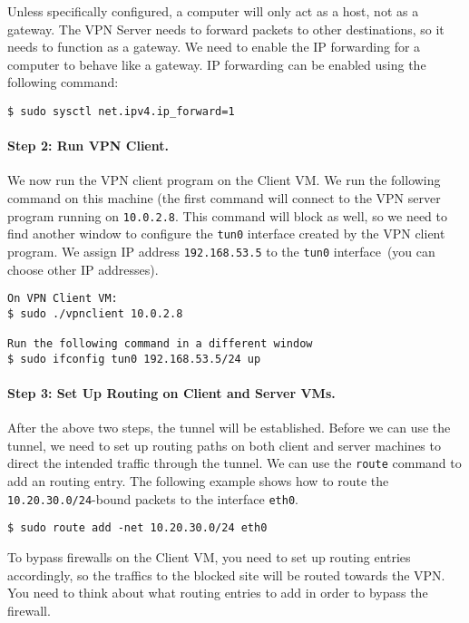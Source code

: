 Unless specifically configured, a computer will only act as a host,
not as a gateway. The VPN Server needs to forward packets to other destinations,
so it needs to function as a gateway. We need to
enable the IP forwarding for a computer to behave like a gateway.
IP forwarding can be enabled
using the following command:

\begin{lstlisting}
$ sudo sysctl net.ipv4.ip_forward=1
\end{lstlisting}



\paragraph{Step 2: Run VPN Client.} 
We now run the VPN client program on the Client
VM.  We run the following command on this machine (the first command
will connect to the VPN server program running on {\tt 10.0.2.8}.
This command will block as well, so we need to find another window to
configure the \texttt{tun0} interface created by the VPN client program.
We assign IP address \texttt{192.168.53.5} to the \texttt{tun0} interface~(you
can choose other IP addresses).


\begin{lstlisting}
On VPN Client VM:
$ sudo ./vpnclient 10.0.2.8

Run the following command in a different window
$ sudo ifconfig tun0 192.168.53.5/24 up
\end{lstlisting}



\paragraph{Step 3: Set Up Routing on Client and Server VMs.}
After the above two steps, the tunnel will be established.
Before we can use the tunnel, we need to set up routing
paths on both client and server machines to direct the intended traffic through
the tunnel. 
We can use the \texttt{route} command to add an routing entry. The
following example shows how to route the \texttt{10.20.30.0/24}-bound
packets to the interface \texttt{eth0}.

\begin{lstlisting}
$ sudo route add -net 10.20.30.0/24 eth0
\end{lstlisting}

To bypass firewalls on the Client VM, you need to set up 
routing entries accordingly, so the traffics to the blocked site
will be routed towards the VPN. You need to think about what 
routing entries to add in order to bypass the firewall. 



